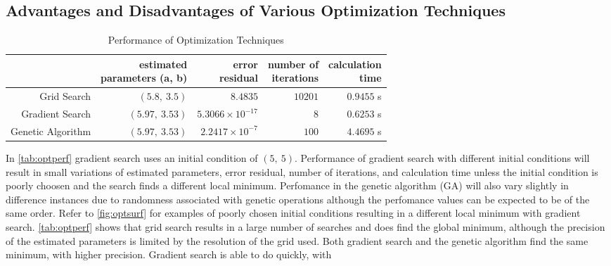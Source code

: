 \documentclass[11pt,a4paper]{article}
\begin{document}
\subsection{Advantages and Disadvantages of Various Optimization Techniques}
\begin{table}
    \centering
    \begin{tabular}{|r|r|r|r|r|}
        \hline
        \nonumber & \shortstack[c]{estimated\\parameters (a, b)} &
            \shortstack[c]{error\\residual} &
            \shortstack[c]{number of\\iterations} &
            \shortstack[c]{calculation\\time} \\
        \hline
        Grid Search & $ (5.8,\: 3.5) $ & $ 8.4835 $ & $ 10201 $ &
            $ 0.9455 $ s \\
        Gradient Search & $ (5.97,\: 3.53) $ & $ 5.3066 \times 10^{-17} $ &
            $ 8 $ & $ 0.6253 $ s \\
        Genetic Algorithm & $ (5.97,\: 3.53) $ & $ 2.2417 \times 10^{-7} $ &
            $ 100 $ & $ 4.4695 $ s \\
        \hline
    \end{tabular}
    \caption{Performance of Optimization Techniques}
    \label{tab:optperf}
\end{table}
In \autoref{tab:optperf} gradient search uses an initial condition of $ (5,\:
5) $. Performance of gradient search with different initial conditions will
result in small variations of estimated parameters, error residual, number of
iterations, and calculation time unless the initial condition is poorly choosen
and the search finds a different local minimum. Perfomance in the genetic
algorithm (GA) will also vary slightly in difference instances due to
randomness associated with genetic operations although the perfomance values
can be expected to be of the same order. Refer to \autoref{fig:optsurf} for
examples of poorly chosen initial conditions resulting in a different local
minimum with gradient search. \autoref{tab:optperf} shows that grid search
results in a large number of searches and does find the global minimum,
although the precision of the estimated parameters is limited by the resolution
of the grid used. Both gradient search and the genetic algorithm find the same
minimum, with higher precision. Gradient search is able to do quickly, with
\end{document}

